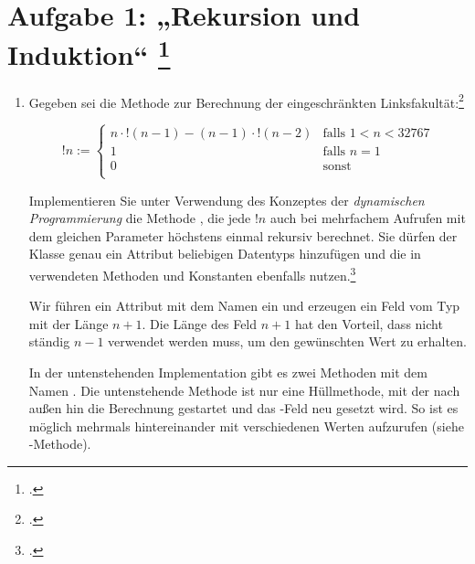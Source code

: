 \documentclass{lehramt-informatik-aufgabe}
\begin{document}
\def\lf#1{\text{lfLong}(#1)}
\def\sk#1{\sum^{#1}_{k=0}k!}


\section{Aufgabe 1: „Rekursion und Induktion“
\footcite[Thema 1 Aufgabe 1b Seite 2-3]{examen:66115:2014:03}}

\begin{enumerate}


\item Gegeben sei die Methode  zur
Berechnung der eingeschränkten Linksfakultät:\footcite[Seite
25]{aud:fs:1}

\begin{equation*}
!n :=
\begin{cases}
n \cdot !(n - 1) - (n - 1) \cdot !(n - 2) &
\text{falls } 1 < n < 32767 \\

1 &
\text{falls } n = 1 \\

0 &
\text{sonst } \\
\end{cases}
\end{equation*}


Implementieren Sie unter Verwendung des Konzeptes der \emph{dynamischen
Programmierung} die Methode , die
jede $!n$ auch bei mehrfachem Aufrufen mit dem gleichen Parameter
höchstens einmal rekursiv berechnet. Sie dürfen der Klasse
 genau ein Attribut beliebigen Datentyps
hinzufügen und die in  verwendeten Methoden und
Konstanten ebenfalls nutzen.\footcite[Aufgabe 5]{aud:pu:1}

\begin{liAntwort}
Wir führen ein Attribut mit dem Namen  ein und
erzeugen ein Feld vom Typ  mit der Länge $n+1$.
Die Länge des Feld $n+1$ hat den Vorteil, dass nicht ständig $n-1$
verwendet werden muss, um den gewünschten Wert zu erhalten.

In der untenstehenden Implementation gibt es zwei Methoden mit dem Namen
. Die untenstehende Methode ist nur eine Hüllmethode, mit
der nach außen hin die Berechnung gestartet und das
-Feld neu gesetzt wird. So ist es möglich
 mehrmals hintereinander mit verschiedenen Werten
aufzurufen (siehe -Methode).


\end{liAntwort}
\end{enumerate}
\end{document}

